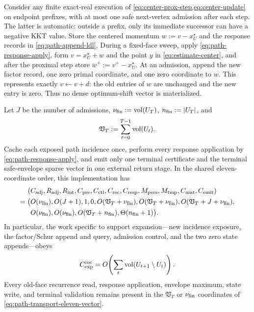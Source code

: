 \begin{proposition}
\label{prop:path-implicit-transport-ledger}
Consider any finite exact-real execution of
\cref{eq:center-prox-step,eq:center-update} on endpoint prefixes, with at most
one safe next-vertex admission after each step.  The latter is automatic:
outside a prefix, only its immediate successor can have a negative KKT value.
Store the centered momentum
$w:=v-x_U^\star$ and the response records in
\cref{eq:path-append-ldl}.  During a fixed-face sweep, apply
\cref{eq:path-response-apply}, form $v=x_U^\star+w$ and the point $y$ in
\cref{eq:estimate-center}, and after the proximal step store
$w^+:=v^+-x_U^\star$.  At an admission, append the new factor record,
one zero primal coordinate, and one zero coordinate to $w$.  This represents
exactly $v\leftarrow v+d$:
the old entries of $w$ are unchanged and the new entry is zero.  Thus no
dense optimum-shift vector is materialized.

Let $J$ be the number of admissions,
$\nu_{\rm fin}:=\operatorname{vol}(U_T)$, $n_{\rm fin}:=|U_T|$, and
\begin{equation}
 \mathfrak V_T:=\sum_{t=0}^{T-1}\operatorname{vol}(U_t).
 \label{eq:path-transport-swept-volume}
\end{equation}
Cache each exposed path incidence once, perform every response application by
\cref{eq:path-response-apply}, and emit only one terminal certificate and the
terminal safe-envelope sparse vector in one external return stage.  In the
shared eleven-coordinate order, this
implementation has
\begin{equation}
 \begin{aligned}
 (&C_{\rm adj},R_{\rm adj},R_{\rm int},C_{\rm pre},C_{\rm ctl},C_{\rm rec},
 C_{\rm resp},M_{\rm pers},M_{\rm tmp},C_{\rm mat},C_{\rm emit})\\
 =\bigl(&O(\nu_{\rm fin}),O(J+1),1,0,
 O(\mathfrak V_T+\nu_{\rm fin}),
 O(\mathfrak V_T+\nu_{\rm fin}),
 O(\mathfrak V_T+J+\nu_{\rm fin}),\\
 &O(\nu_{\rm fin}),O(\nu_{\rm fin}),
 O(\mathfrak V_T+n_{\rm fin}),
 \Theta(n_{\rm fin}+1)\bigr).
 \end{aligned}
 \label{eq:path-transport-eleven-vector}
\end{equation}
In particular, the work specific to support expansion---new incidence
exposure, the factor/Schur append and query, admission control, and the two
zero state appends---obeys
\begin{equation}
 C_{\rm exp}^{\rm inc}
 =O\!\left(\sum_t\operatorname{vol}(U_{t+1}\setminus U_t)\right).
 \label{eq:path-transport-new-volume-charge}
\end{equation}
Every old-face recurrence read, response application, envelope maximum,
state write, and terminal validation remains present in the
$\mathfrak V_T$ or $\nu_{\rm fin}$ coordinates of
\cref{eq:path-transport-eleven-vector}.
\end{proposition}

